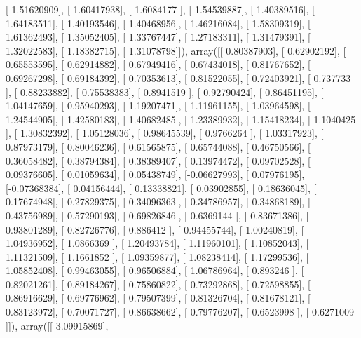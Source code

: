 \documentclass{article}
\begin{document}
       [ 1.51620909],
       [ 1.60417938],
       [ 1.6084177 ],
       [ 1.54539887],
       [ 1.40389516],
       [ 1.64183511],
       [ 1.40193546],
       [ 1.40468956],
       [ 1.46216084],
       [ 1.58309319],
       [ 1.61362493],
       [ 1.35052405],
       [ 1.33767447],
       [ 1.27183311],
       [ 1.31479391],
       [ 1.32022583],
       [ 1.18382715],
       [ 1.31078798]]), array([[ 0.80387903],
       [ 0.62902192],
       [ 0.65553595],
       [ 0.62914882],
       [ 0.67949416],
       [ 0.67434018],
       [ 0.81767652],
       [ 0.69267298],
       [ 0.69184392],
       [ 0.70353613],
       [ 0.81522055],
       [ 0.72403921],
       [ 0.737733  ],
       [ 0.88233882],
       [ 0.75538383],
       [ 0.8941519 ],
       [ 0.92790424],
       [ 0.86451195],
       [ 1.04147659],
       [ 0.95940293],
       [ 1.19207471],
       [ 1.11961155],
       [ 1.03964598],
       [ 1.24544905],
       [ 1.42580183],
       [ 1.40682485],
       [ 1.23389932],
       [ 1.15418234],
       [ 1.1040425 ],
       [ 1.30832392],
       [ 1.05128036],
       [ 0.98645539],
       [ 0.9766264 ],
       [ 1.03317923],
       [ 0.87973179],
       [ 0.80046236],
       [ 0.61565875],
       [ 0.65744088],
       [ 0.46750566],
       [ 0.36058482],
       [ 0.38794384],
       [ 0.38389407],
       [ 0.13974472],
       [ 0.09702528],
       [ 0.09376605],
       [ 0.01059634],
       [ 0.05438749],
       [-0.06627993],
       [ 0.07976195],
       [-0.07368384],
       [ 0.04156444],
       [ 0.13338821],
       [ 0.03902855],
       [ 0.18636045],
       [ 0.17674948],
       [ 0.27829375],
       [ 0.34096363],
       [ 0.34786957],
       [ 0.34868189],
       [ 0.43756989],
       [ 0.57290193],
       [ 0.69826846],
       [ 0.6369144 ],
       [ 0.83671386],
       [ 0.93801289],
       [ 0.82726776],
       [ 0.886412  ],
       [ 0.94455744],
       [ 1.00240819],
       [ 1.04936952],
       [ 1.0866369 ],
       [ 1.20493784],
       [ 1.11960101],
       [ 1.10852043],
       [ 1.11321509],
       [ 1.1661852 ],
       [ 1.09359877],
       [ 1.08238414],
       [ 1.17299536],
       [ 1.05852408],
       [ 0.99463055],
       [ 0.96506884],
       [ 1.06786964],
       [ 0.893246  ],
       [ 0.82021261],
       [ 0.89184267],
       [ 0.75860822],
       [ 0.73292868],
       [ 0.72598855],
       [ 0.86916629],
       [ 0.69776962],
       [ 0.79507399],
       [ 0.81326704],
       [ 0.81678121],
       [ 0.83123972],
       [ 0.70071727],
       [ 0.86638662],
       [ 0.79776207],
       [ 0.6523998 ],
       [ 0.6271009 ]]), array([[-3.09915869],
\end{document}
